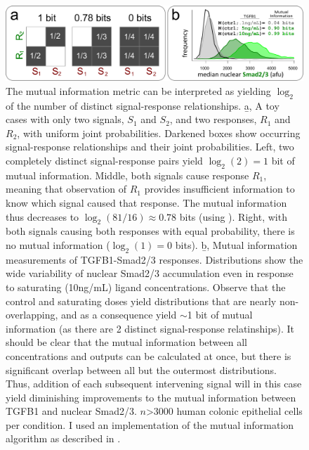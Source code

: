   \begin{figure}[!bt]
  \centering
  \includegraphics[width=6in]{FIGS/imaging/MI.pdf}
  {\singlespacing 
  \caption[ Mutual information examples.]
            {The mutual information metric can be interpreted
            as yielding $\log_2$ of the number of distinct signal-response
            relationships. \b{a}, A toy cases with
            only two signals, $S_1$ and $S_2$, and two responses,
            $R_1$ and $R_2$, with uniform joint probabilities. Darkened
            boxes show occurring signal-response relationships and their
            joint probabilities. Left, two completely distinct
            signal-response pairs yield $\log_2(2)=1$ bit of mutual
            information. Middle, both signals cause response $R_1$,
            meaning that observation of $R_1$ provides insufficient
            information to know which signal caused that response. The mutual
            information thus decreases to $\log_2(81/16)\approx0.78$
            bits (using ). Right, with both signals
            causing both responses with equal probability, there is
            no mutual information ($\log_2(1)=0$ bits).
            \b{b}, Mutual information measurements of TGFB1-Smad2/3
            responses. Distributions show the wide variability
            of nuclear Smad2/3 accumulation even in response to
            saturating (10ng/mL) ligand concentrations. Observe
            that the control and saturating doses yield distributions
            that are nearly non-overlapping, and as a consequence
            yield $\sim$1 bit of mutual information (as there are 2
            distinct signal-response relatinships). It should be clear
            that the mutual information between all concentrations and
            outputs can be calculated at once, but there is significant
            overlap between all but the outermost distributions. Thus,
            addition of each subsequent intervening signal will in this
            case yield diminishing improvements to the mutual information
            between TGFB1 and nuclear Smad2/3.
            $n$>3000
            human colonic epithelial cells per condition. I used
            an implementation of the mutual information algorithm as described
            in \cite{Cheong2011}.}
  \label{fig:imaging:MI}}
  \end{figure}

